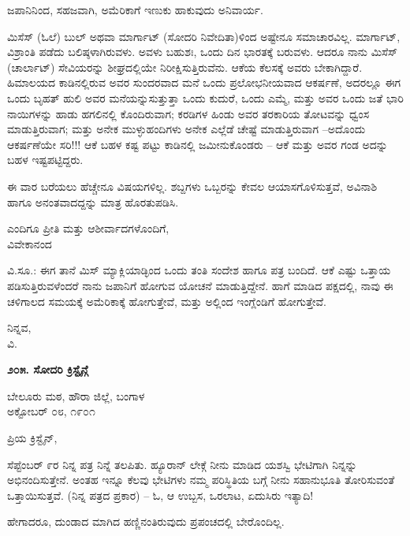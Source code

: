 ಜಪಾನಿನಿಂದ, ಸಹಜವಾಗಿ, ಅಮೆರಿಕಾಗೆ ಇಣುಕು ಹಾಕುವುದು ಅನಿವಾರ್ಯ.

ಮಿಸೆಸ್ (ಓಲೆ) ಬುಲ್ ಅಥವಾ ಮಾರ್ಗಾಟ್ (ಸೋದರಿ ನಿವೇದಿತಾ)ಳಿಂದ ಅಷ್ಟೇನೂ ಸಮಾಚಾರವಿಲ್ಲ. ಮಾರ್ಗಾಟ್, ವಿಶ್ರಾಂತಿ ಪಡೆದು ಬಲಿಷ್ಠಳಾಗಿರುವಳು. ಅವಳು ಬಹುಶಃ, ಒಂದು ದಿನ ಭಾರತಕ್ಕೆ ಬರುವಳು. ಆದರೂ ನಾನು ಮಿಸೆಸ್ (ಚಾರ್ಲಾಟ್) ಸೇವಿಯರನ್ನು ಶೀಘ್ರದಲ್ಲಿಯೇ ನಿರೀಕ್ಷಿಸುತ್ತಿರುವೆನು. ಆಕೆಯ ಕೆಲಸಕ್ಕೆ ಅವರು ಬೇಕಾಗಿದ್ದಾರೆ. ಹಿಮಾಲಯದ ಕಾಡಿನಲ್ಲಿರುವ ಅವರ ಸುಂದರವಾದ ಮನೆ ಒಂದು ಪ್ರಲೋಭನೀಯವಾದ ಆಕರ್ಷಣೆ, ಅದರಲ್ಲೂ ಈಗ ಒಂದು ಬೃಹತ್ ಹುಲಿ ಅವರ ಮನೆಯನ್ನುಸುತ್ತುತ್ತಾ ಒಂದು ಕುದುರೆ, ಒಂದು ಎಮ್ಮೆ, ಮತ್ತು ಅವರ ಒಂದು ಜತೆ ಭಾರಿ ನಾಯಿಗಳನ್ನು ಹಾಡು ಹಗಲಿನಲ್ಲಿ ಕೊಂದಿರುವಾಗ; ಕರಡಿಗಳ ಹಿಂಡು ಅವರ ತರಕಾರಿಯ ತೋಟವನ್ನು ಧ್ವಂಸ ಮಾಡುತ್ತಿರುವಾಗ; ಮತ್ತು ಅನೇಕ ಮುಳ್ಳುಹಂದಿಗಳು ಅನೇಕ ಎಲ್ಲೆಡೆ ಚೇಷ್ಟೆ ಮಾಡುತ್ತಿರುವಾಗ –ಅದೊಂದು ಆಕರ್ಷಣೆಯೇ ಸರಿ!!! ಆಕೆ ಬಹಳ ಕಷ್ಟ ಪಟ್ಟು ಕಾಡಿನಲ್ಲಿ ಜಮೀನುಕೊಂಡರು – ಆಕೆ ಮತ್ತು ಅವರ ಗಂಡ ಅದನ್ನು ಬಹಳ ಇಷ್ಟಪಟ್ಟಿದ್ದರು.

ಈ ವಾರ ಬರೆಯಲು ಹೆಚ್ಚೇನೂ ವಿಷಯಗಳಿಲ್ಲ. ಶಬ್ದಗಳು ಒಬ್ಬರನ್ನು ಕೇವಲ ಆಯಾಸಗೊಳಿಸುತ್ತವೆ, ಅವಿನಾಶಿ ಹಾಗೂ ಅನಂತವಾದದ್ದನ್ನು ಮಾತ್ರ ಹೊರತುಪಡಿಸಿ.

\begin{flushright}
ಎಂದಿಗೂ ಪ್ರೀತಿ ಮತ್ತು ಆಶೀರ್ವಾದಗಳೊಂದಿಗೆ,\\ವಿವೇಕಾನಂದ
\end{flushright}

ವಿ.ಸೂ.: ಈಗ ತಾನೆ ಮಿಸ್ ಮ್ಯಾಕ್ಲಿಯಾಡ್ಳಿಂದ ಒಂದು ತಂತಿ ಸಂದೇಶ ಹಾಗೂ ಪತ್ರ ಬಂದಿದೆ. ಆಕೆ ಎಷ್ಟು ಒತ್ತಾಯ ಪಡಿಸುತ್ತಿರುವಳೆಂದರೆ ನಾನು ಜಪಾನಿಗೆ ಹೋಗುವ ಯೋಚನೆ ಮಾಡುತ್ತಿದ್ದೇನೆ. ಹಾಗೆ ಮಾಡಿದ ಪಕ್ಷದಲ್ಲಿ, ನಾವು ಈ ಚಳಿಗಾಲದ ಸಮಯಕ್ಕೆ ಅಮೆರಿಕಾಕ್ಕೆ ಹೋಗುತ್ತೇವೆ, ಮತ್ತು ಅಲ್ಲಿಂದ ಇಂಗ್ಲೆಂಡಿಗೆ ಹೋಗುತ್ತೇವೆ.

\begin{flushright}
ನಿನ್ನವ,\\ವಿ.
\end{flushright}

\begin{center}
\textbf{೨೦೫. ಸೋದರಿ ಕ್ರಿಸ್ಟೈನ್ಗೆ}
\end{center}

\begin{flushright}
ಬೇಲೂರು ಮಠ, ಹೌರಾ ಜಿಲ್ಲೆ, ಬಂಗಾಳ\\ಅಕ್ಟೋಬರ್ ೦೮, ೧೯೦೧
\end{flushright}

ಪ್ರಿಯ ಕ್ರಿಸ್ಟೈನ್,

ಸೆಪ್ಟೆಂಬರ್ ೯ರ ನಿನ್ನ ಪತ್ರ ನಿನ್ನೆ ತಲಪಿತು. ಹ್ಯೂರಾನ್ ಲೇಕ್ಗೆ ನೀನು ಮಾಡಿದ ಯಶಸ್ವಿ ಭೇಟಿಗಾಗಿ ನಿನ್ನನ್ನು ಅಭಿನಂದಿಸುತ್ತೇನೆ. ಅಂತಹ ಇನ್ನೂ ಕೆಲವು ಭೇಟಿಗಳು ನಮ್ಮ ಪರಿಸ್ಥಿತಿಯ ಬಗ್ಗೆ ನೀನು ಸಹಾನುಭೂತಿ ತೋರಿಸುವಂತೆ ಒತ್ತಾಯಿಸುತ್ತವೆ. (ನಿನ್ನ ಪತ್ರದ ಪ್ರಕಾರ) – ಓ, ಆ ಉಬ್ಬಸ, ಒರಲಾಟ, ಏದುಸಿರು ಇತ್ಯಾದಿ!

ಹೇಗಾದರೂ, ದುಂಡಾದ ಮಾಗಿದ ಹಣ್ಣಿನಂತಿರುವುದು ಪ್ರಪಂಚದಲ್ಲಿ ಬೇರೊಂದಿಲ್ಲ.

